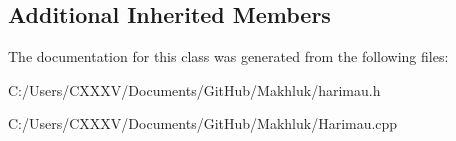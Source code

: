 \subsection*{Additional Inherited Members}


The documentation for this class was generated from the following files\+:\begin{DoxyCompactItemize}
\item 
C\+:/\+Users/\+C\+X\+X\+X\+V/\+Documents/\+Git\+Hub/\+Makhluk/harimau.\+h\item 
C\+:/\+Users/\+C\+X\+X\+X\+V/\+Documents/\+Git\+Hub/\+Makhluk/Harimau.\+cpp\end{DoxyCompactItemize}
